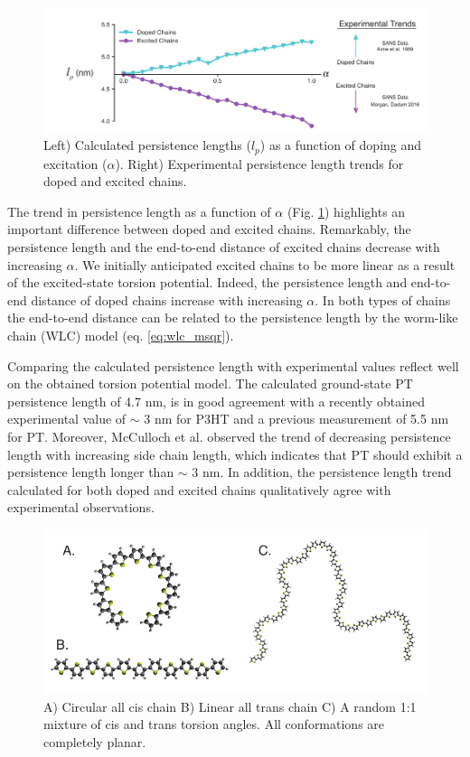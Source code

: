\begin{figure}[hbt!]
    \centering
    \includegraphics{figures/chap2/persist_len.pdf}
    \caption{Left) Calculated persistence lengths ($l_p$) as a function of doping and excitation ($\alpha$). Right) Experimental persistence length trends for doped and excited chains.}
    \label{fig:lp}
\end{figure}

The trend in persistence length as a function of $\alpha$ (Fig. \ref{fig:lp}) highlights an important difference between doped and excited chains. Remarkably, the persistence length and the end-to-end distance of excited chains decrease with increasing $\alpha$. We initially anticipated excited chains to be more linear as a result of the excited-state torsion potential. Indeed, the persistence length and end-to-end distance of doped chains increase with increasing $\alpha$. In both types of chains the end-to-end distance can be related to the persistence length by the worm-like chain (WLC) model (eq. \ref{eq:wlc_msqr}).

Comparing the calculated persistence length with experimental values reflect well on the obtained torsion potential model. The calculated ground-state PT persistence length of 4.7 nm, is in good agreement with a recently obtained experimental value of $\sim$ 3 nm for P3HT\cite{Mcculloch2013} and a previous measurement of 5.5 nm for PT.\cite{Aime1989} Moreover, McCulloch et al. observed the trend of decreasing persistence length with increasing side chain length, which indicates that PT should exhibit a persistence length longer than $\sim$ 3 nm. In addition, the persistence length trend calculated for both doped and excited chains qualitatively agree with experimental observations.

\begin{figure}[hbt!]
    \centering
    \includegraphics{figures/chap2/planar_chains.pdf}
    \caption{A) Circular all cis chain B) Linear all trans chain C) A random 1:1 mixture of cis and trans torsion angles. All conformations are completely planar.}
    \label{fig:ideal}
\end{figure}

